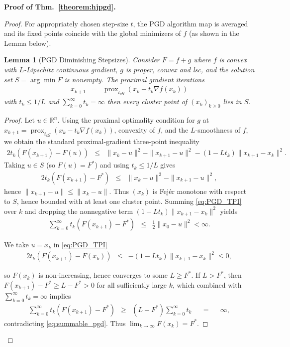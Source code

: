 \documentclass{article}
\newcommand{\prox}{\operatorname{prox}}
\newcommand{\amp}{\mathop{\:\:\,}\nolimits}
\theoremstyle{plain}
\newtheorem{lemma}[theorem]{Lemma}
\theoremstyle{definition}
\theoremstyle{remark}
\begin{document}
\noindent \textbf{Proof of Thm.~\ref{theorem:hjpgd}.}
\textit{}
\begin{proof}
For appropriately chosen step-size $t$, the PGD algorithm map is averaged and its fixed points coincide with the global minimizers of $f$ (as shown in the Lemma below).

\begin{lemma}[PGD Diminishing Stepsizes]\label{lem: PGD_Convergence}
Consider $F = f+ g$ where $f$ is convex with $L$-Lipschitz continuous gradient, $g$ is proper, convex and lsc, and the solution set $S = \arg\min F$ is nonempty. The proximal gradient iterations
\begin{eqnarray}
    x_{k+1} &=& \prox_{t_k g}(x_k - t_k \nabla f(x_k))
\end{eqnarray}
with $t_k \leq 1/L$ and $\sum_{k=0}^{\infty} t_k = \infty$ then every cluster point of $(x_k)_{k \geq 0}$ lies in $S$.
\end{lemma}

\begin{proof}
Let $u\in\mathbb{R}^n$. Using the proximal optimality condition for $g$ at
$x_{k+1}=\prox_{t_k g}(x_k-t_k\nabla f(x_k))$, convexity of $f$, and the $L$-smoothness of $f$,
we obtain the standard proximal-gradient three-point inequality
\begin{eqnarray}\label{eq:PGD_TPI}
    2t_k(F(x_{k+1}) - F(u))
    &\leq & \|x_k-u\|^2 - \|x_{k+1}-u\|^2 - (1-Lt_k)\|x_{k+1}-x_k\|^2 .
\end{eqnarray}
Taking $u \in S$ (so $F(u)=F^*$) and using $t_k\le 1/L$ gives
\begin{eqnarray}
2t_k(F(x_{k+1})-F^*) &\le& \|x_k-u\|^2-\|x_{k+1}-u\|^2,
\end{eqnarray}
hence $\|x_{k+1}-u\|\le \|x_k-u\|$. Thus $(x_k)$ is Fej\'er monotone with respect to $S$,
hence bounded with at least one cluster point. Summing \eqref{eq:PGD_TPI} over $k$ and dropping the
nonnegative term $(1-Lt_k)\|x_{k+1}-x_k\|^2$ yields
\begin{eqnarray}\label{eq:summable_pgd}
    \sum_{k=0}^{\infty} t_k(F(x_{k+1}) - F^*) &\leq& \frac{1}{2}\|x_0-u\|^2 < \infty.
\end{eqnarray}

We take $u=x_k$ in \eqref{eq:PGD_TPI} 
\begin{eqnarray}
    2t_k(F(x_{k+1})-F(x_k)) &\le& -(1-Lt_k)\|x_{k+1}-x_k\|^2 \le 0,
\end{eqnarray}

so $F(x_k)$ is non-increasing, hence converges to some $L \geq F^*$. If $L > F^*$, then
$F(x_{k+1}) - F^* \geq L - F^* > 0$ for all sufficiently large $k$, which combined with
$\sum_{k=0}^\infty t_k=\infty$ implies
\begin{eqnarray}
\sum_{k=0}^{\infty} t_k(F(x_{k+1}) - F^*) &\geq& (L-F^*)\sum_{k=0}^{\infty} t_k \amp=\amp \infty,
\end{eqnarray}
contradicting \eqref{eq:summable_pgd}. Thus $\lim_{k \to \infty} F(x_k) = F^*$.


\end{proof}
\end{proof}
\end{document}
